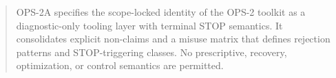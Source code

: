 ﻿%

\begin{abstract}
OPS-2A specifies the scope-locked identity of the OPS-2 toolkit as a diagnostic-only
tooling layer with terminal STOP semantics. It consolidates explicit non-claims and
a misuse matrix that defines rejection patterns and STOP-triggering classes.
No prescriptive, recovery, optimization, or control semantics are permitted.
\end{abstract}
